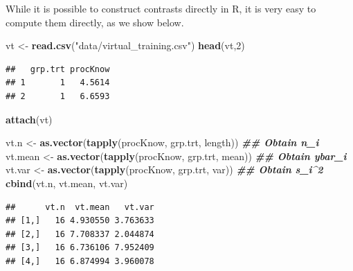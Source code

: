 \documentclass[
]{book}
\newenvironment{Shaded}{\begin{snugshade}}{\end{snugshade}}
\newcommand{\DecValTok}[1]{\textcolor[rgb]{0.00,0.00,0.81}{#1}}
\newcommand{\DocumentationTok}[1]{\textcolor[rgb]{0.56,0.35,0.01}{\textbf{\textit{#1}}}}
\newcommand{\FunctionTok}[1]{\textcolor[rgb]{0.13,0.29,0.53}{\textbf{#1}}}
\newcommand{\NormalTok}[1]{#1}
\newcommand{\OtherTok}[1]{\textcolor[rgb]{0.56,0.35,0.01}{#1}}
\newcommand{\StringTok}[1]{\textcolor[rgb]{0.31,0.60,0.02}{#1}}
\begin{document}
While it is possible to construct contrasts directly in R, it is very
easy to compute them directly, as we show below.

\begin{Shaded}
\begin{Highlighting}[]
\NormalTok{vt }\OtherTok{\textless{}{-}} \FunctionTok{read.csv}\NormalTok{(}\StringTok{"data/virtual\_training.csv"}\NormalTok{)}
\FunctionTok{head}\NormalTok{(vt,}\DecValTok{2}\NormalTok{)}
\end{Highlighting}
\end{Shaded}

\begin{verbatim}
##   grp.trt procKnow
## 1       1   4.5614
## 2       1   6.6593
\end{verbatim}

\begin{Shaded}
\begin{Highlighting}[]
\FunctionTok{attach}\NormalTok{(vt)}

\NormalTok{vt.n }\OtherTok{\textless{}{-}} \FunctionTok{as.vector}\NormalTok{(}\FunctionTok{tapply}\NormalTok{(procKnow, grp.trt, length))     }\DocumentationTok{\#\# Obtain n\_i}
\NormalTok{vt.mean }\OtherTok{\textless{}{-}} \FunctionTok{as.vector}\NormalTok{(}\FunctionTok{tapply}\NormalTok{(procKnow, grp.trt, mean))    }\DocumentationTok{\#\# Obtain ybar\_i}
\NormalTok{vt.var }\OtherTok{\textless{}{-}} \FunctionTok{as.vector}\NormalTok{(}\FunctionTok{tapply}\NormalTok{(procKnow, grp.trt, var))      }\DocumentationTok{\#\# Obtain s\_i\^{}2}
\FunctionTok{cbind}\NormalTok{(vt.n, vt.mean, vt.var)}
\end{Highlighting}
\end{Shaded}

\begin{verbatim}
##      vt.n  vt.mean   vt.var
## [1,]   16 4.930550 3.763633
## [2,]   16 7.708337 2.044874
## [3,]   16 6.736106 7.952409
## [4,]   16 6.874994 3.960078
\end{verbatim}
\end{document}
